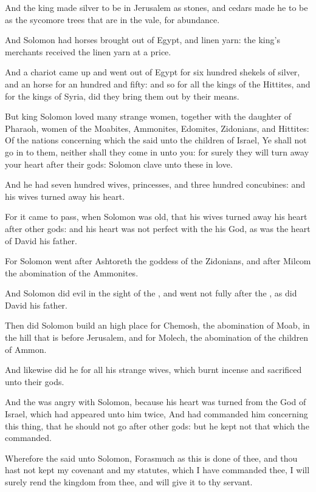 \Verse And the king made silver to be in Jerusalem as stones, and cedars made he to be as the sycomore trees that are in the vale, for abundance.

\Verse And Solomon had horses brought out of Egypt, and linen yarn: the king's merchants received the linen yarn at a price.

\Verse And a chariot came up and went out of Egypt for six hundred shekels of silver, and an horse for an hundred and fifty: and so for all the kings of the Hittites, and for the kings of Syria, did they bring them out by their means.


\Chapter
\Verse But king Solomon loved many strange women, together with the daughter of Pharaoh, women of the Moabites, Ammonites, Edomites, Zidonians, and Hittites: \Verse Of the nations concerning which the \LORD said unto the children of Israel, Ye shall not go in to them, neither shall they come in unto you: for surely they will turn away your heart after their gods: Solomon clave unto these in love.

\Verse And he had seven hundred wives, princesses, and three hundred concubines: and his wives turned away his heart.

\Verse For it came to pass, when Solomon was old, that his wives turned away his heart after other gods: and his heart was not perfect with the \LORD his God, as was the heart of David his father.

\Verse For Solomon went after Ashtoreth the goddess of the Zidonians, and after Milcom the abomination of the Ammonites.

\Verse And Solomon did evil in the sight of the \LORD, and went not fully after the \LORD, as did David his father.

\Verse Then did Solomon build an high place for Chemosh, the abomination of Moab, in the hill that is before Jerusalem, and for Molech, the abomination of the children of Ammon.

\Verse And likewise did he for all his strange wives, which burnt incense and sacrificed unto their gods.

\Verse And the \LORD was angry with Solomon, because his heart was turned from the \LORD God of Israel, which had appeared unto him twice, \Verse And had commanded him concerning this thing, that he should not go after other gods: but he kept not that which the \LORD commanded.

\Verse Wherefore the \LORD said unto Solomon, Forasmuch as this is done of thee, and thou hast not kept my covenant and my statutes, which I have commanded thee, I will surely rend the kingdom from thee, and will give it to thy servant.

